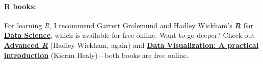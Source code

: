 \documentclass[10pt]{article}
\newcommand{\ra}[1]{\renewcommand{\arraystretch}{#1}}
\begin{document}
\paragraph{R books:} For learning \emph{R}, I recommend Garrett Grolemund and Hadley Wickham's \href{http://r4ds.had.co.nz}{\textbf{\textit{R} for Data Science}}, which is available for free online. Want to go deeper? Check out \href{http://adv-r.had.co.nz/}{\textbf{Advanced \emph{R}}} (Hadley Wickham, again) and \href{http://socviz.co/}{\textbf{Data Visualization: A practical introduction}} (Kieran Healy)---both books are free online.





\end{document}
